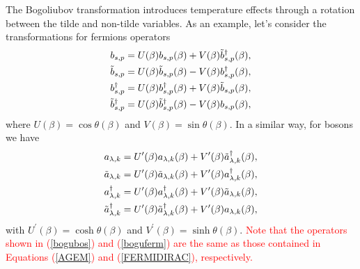 \documentclass[11pt,showpacs,preprintnumbers,amsmath,amssymb,prd,nofootinbib,superscriptaddress]{revtex4-2}
\begin{document}
The Bogoliubov transformation introduces temperature effects through a rotation between the tilde and non-tilde variables. As an example, let's consider the transformations for fermions operators
\begin{eqnarray}
    b_{s,p}=U(\beta)b_{s,p}(\beta)+V(\beta)\Tilde{b}_{s,p}^\dagger(\beta),\nonumber\\
    \Tilde{b}_{s,p}=U(\beta)\Tilde{b}_{s,p}(\beta)-V(\beta)b_{s,p}^\dagger(\beta),\nonumber\\
    b_{s,p}^\dagger=U(\beta)b_{s,p}^\dagger(\beta)+V(\beta)\Tilde{b}_{s,p}(\beta),\nonumber\\
    \Tilde{b}_{s,p}^\dagger=U(\beta)\Tilde{b}_{s,p}^\dagger(\beta)-V(\beta)b_{s,p}(\beta),\label{boguferm}
\end{eqnarray}
where $U(\beta)=\cos{\theta}(\beta)$ and $V(\beta)=\sin{\theta}(\beta)$. In a similar way, for bosons we have 
\begin{eqnarray}
a_{\lambda,k}=U^\prime(\beta)a_{\lambda,k}(\beta)+V^\prime(\beta)\Tilde{a}_{\lambda,k}^\dagger(\beta),\nonumber\\
    \Tilde{a}_{\lambda,k}=U^\prime(\beta)\Tilde{a}_{\lambda,k}(\beta)+V^\prime(\beta)a_{\lambda,k}^\dagger(\beta),\nonumber\\
    a_{\lambda,k}^\dagger=U^\prime(\beta)a_{\lambda,k}^\dagger(\beta)+V^\prime(\beta)\Tilde{a}_{\lambda,k}(\beta),\nonumber\\
    \Tilde{a}_{\lambda,k}^\dagger=U^\prime(\beta)\Tilde{a}_{\lambda,k}^\dagger(\beta)+V^\prime(\beta)a_{\lambda,k}(\beta),\label{bogubos}
\end{eqnarray}
with $U^\prime(\beta)=\cosh{\theta}(\beta)$ and $V^\prime(\beta)=\sinh{\theta}(\beta)$. \textcolor{red}{Note that the operators shown in (\ref{bogubos}) and (\ref{boguferm}) are the same as those contained in Equations (\ref{AGEM}) and (\ref{FERMIDIRAC}), respectively.}
\end{document}
